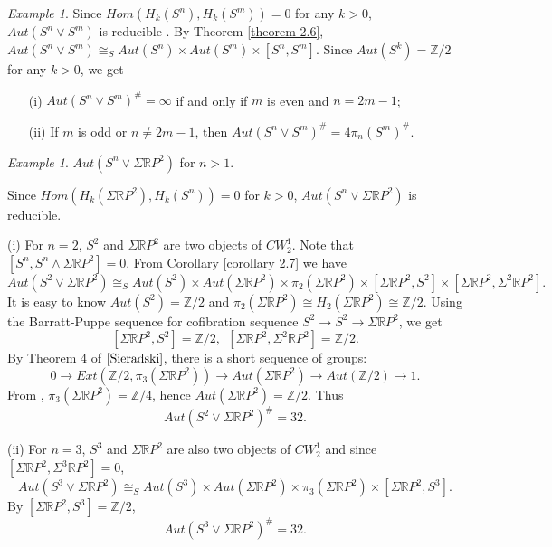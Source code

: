 \documentclass[12pt]{article}
\theoremstyle{theorem}
\theoremstyle{definition}
\theoremstyle{proposition}
\theoremstyle{corollary}
\theoremstyle{lemma}
\theoremstyle{remark}
\theoremstyle{example}
\newtheorem{example}[theorem]{Example}
\begin{document}
{\begin{example}
  Since $Hom(H_{k}(S^{n}), H_{k}(S^{m}))=0$ for any $k>0$, $Aut(S^{n}\vee S^{m})$ is reducible \cite{YS2}.
  By Theorem \ref{theorem 2.6}, $Aut(S^{n}\vee S^{m})\cong_{S} Aut(S^{n})\times Aut(S^{m})\times [S^{n}, S^{m}]$. Since $Aut(S^{k})=\mathbb{Z}/2$ for any $k>0$, we get
  \begin{itemize}
    \item [(i)] $ Aut(S^{n}\vee S^{m})^{\#}=\infty$ if and only if $m$ is even and $n=2m-1$;
    \item [(ii)] If $m$ is odd  or $n\neq 2m-1$, then $Aut(S^{n}\vee S^{m})^{\#}=4\pi_{n}(S^{m})^{\#}$.
  \end{itemize}
\end{example}

\begin{example}\label{example2.9}
$ Aut(S^{n}\vee \Sigma \mathbb{R}P^2)$ for $n>1$.

 Since $Hom(H_{k}( \Sigma \mathbb{R}P^2), H_{k}(S^n))=0$ for $k>0$, $Aut(S^{n}\vee \Sigma \mathbb{R}P^2)$ is reducible.

 (i) For $n=2$, $S^2$ and $\Sigma\mathbb{R}P^2$ are two objects of $CW^1_{2}$. Note that $[S^{n}, S^{n}\wedge\Sigma\mathbb{R}P^2]=0$. From Corollary \ref{corollary 2.7} we have
  $$Aut(S^{2}\vee \Sigma \mathbb{R}P^2)\cong_{S}Aut(S^{2})\times Aut(\Sigma\mathbb{R}P^2)\times \pi_{2}(\Sigma\mathbb{R}P^2)\times [\Sigma\mathbb{R}P^2,S^{2}]\times [\Sigma\mathbb{R}P^2,\Sigma^2\mathbb{R}P^2].$$
 It is easy to know $Aut(S^2)=\mathbb{Z}/2$ and $\pi_{2}(\Sigma\mathbb{R}P^2)\cong H_{2}(\Sigma\mathbb{R}P^2)\cong \mathbb{Z}/2.$
 Using the Barratt-Puppe sequence for cofibration sequence $S^{2}\rightarrow S^{2}\rightarrow \Sigma\mathbb{R}P^2$, we get
$$[\Sigma\mathbb{R}P^2,S^{2}]=\mathbb{Z}/2,~~ [\Sigma\mathbb{R}P^2,\Sigma^2\mathbb{R}P^2]=\mathbb{Z}/2.$$
 By Theorem $4$ of $\cite{Sieradski}$, there is a short sequence of groups:
  $$0\rightarrow Ext(\mathbb{Z}/2, \pi_{3}(\Sigma\mathbb{R}P^2))\rightarrow Aut(\Sigma\mathbb{R}P^2)\rightarrow Aut(\mathbb{Z}/2)\rightarrow 1.$$
 From \cite{BaHH}, $\pi_{3}(\Sigma\mathbb{R}P^2)=\mathbb{Z}/4$, hence $Aut(\Sigma\mathbb{R}P^2)=\mathbb{Z}/2.$  Thus
$$ Aut(S^{2}\vee \Sigma \mathbb{R}P^2)^{\#}=32.$$

(ii) For $n=3$, $S^3$ and $\Sigma\mathbb{R}P^2$ are also two objects of $CW^1_{2}$ and since $[\Sigma\mathbb{R}P^2,\Sigma^3\mathbb{R}P^2]=0$,
 $$Aut(S^{3}\vee \Sigma \mathbb{R}P^2)\cong_{S}Aut(S^{3})\times Aut(\Sigma\mathbb{R}P^2)\times \pi_{3}(\Sigma\mathbb{R}P^2)\times [\Sigma\mathbb{R}P^2,S^{3}].$$
  By $ [\Sigma\mathbb{R}P^2,S^{3}]=\mathbb{Z}/2$,  $$ Aut(S^{3}\vee \Sigma \mathbb{R}P^2)^{\#}=32.$$


\end{example}}
\end{document}
